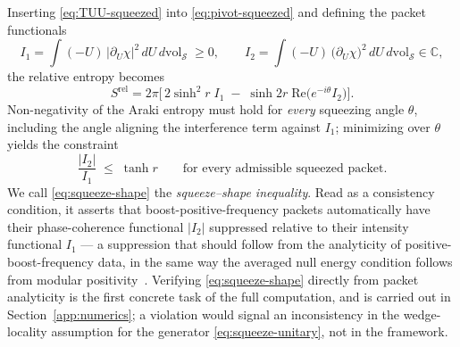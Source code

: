 \documentclass[11pt]{article}
\newcommand{\Srel}{S^{\mathrm{rel}}}
\begin{document}
Inserting \eqref{eq:TUU-squeezed} into \eqref{eq:pivot-squeezed} and defining the packet functionals
\begin{equation}
I_1 = \int (-U)\,\big|\partial_U\chi\big|^2\, dU\, d\mathrm{vol}_{\mathcal{S}} \;\ge 0,
\qquad
I_2 = \int (-U)\,\big(\partial_U\chi\big)^2\, dU\, d\mathrm{vol}_{\mathcal{S}} \in \mathbb{C},
\end{equation}
the relative entropy becomes
\begin{equation}
\Srel = 2\pi\Big[\, 2\sinh^2\! r \; I_1 \;-\; \sinh 2r\; \mathrm{Re}\big(e^{-i\theta} I_2\big) \Big].
\label{eq:Srel-squeezed}
\end{equation}
Non-negativity of the Araki entropy must hold for \emph{every} squeezing angle $\theta$, including the angle aligning the interference term against $I_1$; minimizing over $\theta$ yields the constraint
\begin{equation}
\frac{|I_2|}{I_1} \;\le\; \tanh r
\qquad \text{for every admissible squeezed packet.}
\label{eq:squeeze-shape}
\end{equation}
We call \eqref{eq:squeeze-shape} the \emph{squeeze--shape inequality}. Read as a consistency condition, it asserts that boost-positive-frequency packets automatically have their phase-coherence functional $|I_2|$ suppressed relative to their intensity functional $I_1$ --- a suppression that should follow from the analyticity of positive-boost-frequency data, in the same way the averaged null energy condition follows from modular positivity~\cite{FLPW}. Verifying \eqref{eq:squeeze-shape} directly from packet analyticity is the first concrete task of the full computation, and is carried out in Section~\ref{app:numerics}; a violation would signal an inconsistency in the wedge-locality assumption for the generator \eqref{eq:squeeze-unitary}, not in the framework.
\end{document}
